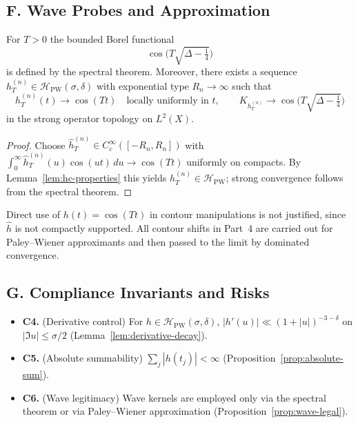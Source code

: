 \subsection*{F. Wave Probes and Approximation}
\label{subsec:wave-probes}

\begin{proposition}
\label{prop:wave-legal}
For $T>0$ the bounded Borel functional
\[
  \cos\!\Big(T\sqrt{\Delta-\tfrac14}\Big)
\]
is defined by the spectral theorem. Moreover, there exists a sequence $h_T^{(n)}\in \mathcal H_{\mathrm{PW}}(\sigma,\delta)$ with exponential type $R_n\to\infty$ such that
\[
  h_T^{(n)}(t)\to \cos(Tt)\quad \text{locally uniformly in }t,\qquad
  K_{h_T^{(n)}} \to \cos\!\Big(T\sqrt{\Delta-\tfrac14}\Big)
\]
in the strong operator topology on $L^2(X)$.
\end{proposition}

\begin{proof}
Choose $\widehat h_T^{(n)}\in C_c^\infty([-R_n,R_n])$ with $\int_0^\infty \widehat h_T^{(n)}(u)\cos(ut)\,du \to \cos(Tt)$ uniformly on compacts. By Lemma~\ref{lem:hc-properties} this yields $h_T^{(n)}\in\mathcal H_{\mathrm{PW}}$; strong convergence follows from the spectral theorem.
\end{proof}

\begin{remark}
Direct use of $h(t)=\cos(Tt)$ in contour manipulations is not justified, since $\widehat h$ is not compactly supported. All contour shifts in Part~4 are carried out for Paley–Wiener approximants and then passed to the limit by dominated convergence.
\end{remark}

\subsection*{G. Compliance Invariants and Risks}
\label{subsec:invariants-part2}

\begin{itemize}
  \item \textbf{C4.} (Derivative control) For $h\in \mathcal H_{\mathrm{PW}}(\sigma,\delta)$, $|h'(u)|\ll (1+|u|)^{-3-\delta}$ on $|\Im u|\le \sigma/2$ (Lemma~\ref{lem:derivative-decay}).
  \item \textbf{C5.} (Absolute summability) $\sum_j |h(t_j)|<\infty$ (Proposition~\ref{prop:absolute-sum}).
  \item \textbf{C6.} (Wave legitimacy) Wave kernels are employed only via the spectral theorem or via Paley–Wiener approximation (Proposition~\ref{prop:wave-legal}).
\end{itemize}

